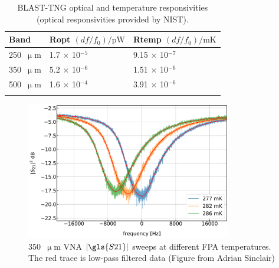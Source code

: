 \begin{table}[!htbp]
\centering
\begin{tabular}{@{}lll@{}}
\dtoprule
Band & \gls{Ropt} $(df/f_{0})/\mathrm{pW}$     & \gls{Rtemp} $(df/f_{0})/\mathrm{mK}$ \\ \midrule
250~$\upmu$m & 1.7 $\times$ 10$^{-5}$ & 9.15 $\times$ 10$^{-7}$ \\
350~$\upmu$m & 5.2 $\times$ 10$^{-6}$ & 1.51 $\times$ 10$^{-6}$ \\
500~$\upmu$m & 1.6 $\times$ 10$^{-4}$ & 3.91 $\times$ 10$^{-6}$ \\ \dbottomrule
\\
\end{tabular}
\caption[~BLAST-TNG optical and temperature responsivities.]{BLAST-TNG optical and temperature responsivities (optical responsivities provided by NIST).}
\label{table:responsivities}
\end{table}

\begin{figure}[!htbp]
\centering
\includegraphics[width=0.8\textwidth]{figures/blast_data/sweeps/temp_sweep_pal}
\caption[~350  VNA sweeps at different FPA temperatures.]{350~$\upmu$m VNA $|\gls{S21}|$ sweeps at different FPA temperatures. The red trace is low-pass filtered data (Figure from Adrian Sinclair)}
\label{fig:temp sweeps}
\end{figure}

